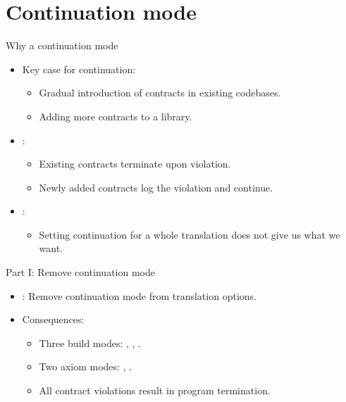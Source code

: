 \section{Continuation mode}

\begin{frame}[t]{Why a continuation mode}
\begin{itemize}
	\item Key  case for continuation:
    \begin{itemize}
      \item Gradual introduction of contracts in existing codebases.
      \item Adding more contracts to a library.
    \end{itemize}
  \vfill
  \item {}:
    \begin{itemize}
      \item Existing contracts terminate upon violation.
      \item Newly added contracts log the violation and continue.
    \end{itemize}
  \vfill
  \item {}:
    \begin{itemize}
      \item Setting continuation for a whole translation does not give us what we want.
    \end{itemize}
\end{itemize}
\end{frame}

\begin{frame}[t]{Part I: Remove continuation mode}
\begin{itemize}
  \item {}: Remove continuation mode from translation options.

  \vfill
  \item Consequences:
    \begin{itemize}
      \item Three build modes: , , .
      \item Two axiom modes: , .
      \item All contract violations result in program termination.
    \end{itemize}
\end{itemize}
\end{frame}

